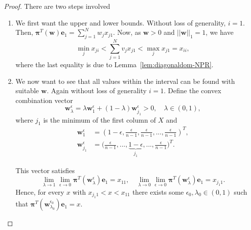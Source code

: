 \documentclass[10pt,a4paper]{amsart}
\def\nn{\nonumber}
\newcommand{\be}{\mathbf{e}}
\newcommand{\bw}{\bm{w}}
\begin{document}
\begin{proof}
	There are two steps involved
	\begin{enumerate}
		\item We first want the upper and lower bounds. Without loss of generality, $i=1$. Then, $\bm{\pi}^T(\bw)\be_1 =\sum_{j=1}^N w_j x_{j1}$. Now, as $\bw>0$ and $||\bw||_1=1$, we have
		\begin{equation}
			\min_j x_{ji} < \sum_{j=1}^N v_j x_{j1} < \max_j x_{j1} = x_{ii},
		\end{equation}
		where the last equality is due to Lemma~\ref{lem:diagonaldom-NPR}.
		
		\item We now want to see that all values within the interval can be found with suitable $\bw$. Again without loss of generality $i=1$. Define the convex combination vector
		\begin{equation}
			\bw^\epsilon_\lambda = \lambda \bw_1^\epsilon + (1-\lambda) \bw_{j_1}^\epsilon > 0, \quad \lambda\in (0,1),
		\end{equation}
		where $j_1$ is the minimum of the first column of $X$ and
		\begin{align}
			\bw_1^\epsilon &= \left(1-\epsilon, \frac{\epsilon}{n-1}, \frac{\epsilon}{n-1}, ..., \frac{\epsilon}{n-1}\right)^T, \nn \\
			\bw_{j_1}^\epsilon &= \bigg(\frac{\epsilon}{n-1}, ..., \underbrace{1-\epsilon}_{j_1}, ..., \frac{\epsilon}{n-1}\bigg)^T. 
		\end{align}
		
		This vector satisfies
		\begin{equation}
			\lim_{\lambda\rightarrow1} \lim_{\epsilon\rightarrow0} \bm{\pi}^T(\bw_{\lambda}^\epsilon)\be_1 = x_{11},\quad \lim_{\lambda\rightarrow0} \lim_{\epsilon\rightarrow0} \bm{\pi}^T(\bw_{\lambda}^\epsilon)\be_1 = x_{j_1 1}.
		\end{equation}
		Hence, for every $x$ with $x_{j_1 1} < x < x_{11}$ there exists some $\epsilon_0,\lambda_0 \in (0,1)$ such that $\bm{\pi}^T(\bw_{\lambda_0}^{\epsilon_0})\be_1 = x$.
	\end{enumerate}
\end{proof}
\end{document}
